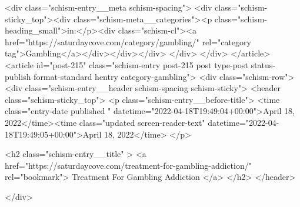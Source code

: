 {		<div class="schism-entry__meta schism-spacing">			<div class="schism-sticky_top"><div class="schism-meta__categories"><p class="schism-heading_small">in:</p><div class="schism-cl"><a href="https://saturdaycove.com/category/gambling/" rel="category tag">Gambling</a></div></div></div>		</div>
	</div>
</article>
<article id="post-215" class="schism-entry post-215 post type-post status-publish format-standard hentry category-gambling">
	<div class="schism-row">		<div class="schism-entry__header schism-spacing schism-sticky">			<header class="schism-sticky_top">				<p class="schism-entry__before-title">
					<time class="entry-date published " datetime="2022-04-18T19:49:04+00:00">April 18, 2022</time><time class="updated screen-reader-text" datetime="2022-04-18T19:49:05+00:00">April 18, 2022</time>				</p>

				<h2 class="schism-entry__title" >
					<a href="https://saturdaycove.com/treatment-for-gambling-addiction/" rel="bookmark">
						Treatment For Gambling Addiction					</a>
				</h2>
			</header>

					</div>

}
